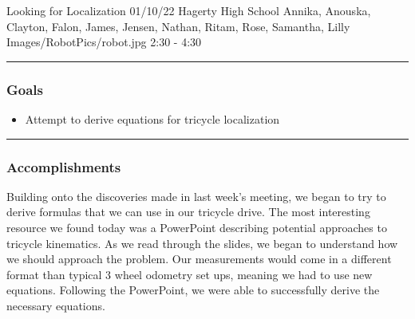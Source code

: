 \insertmeeting 
	{Looking for Localization} 
	{01/10/22} 
	{Hagerty High School}
	{Annika, Anouska, Clayton, Falon, James, Jensen, Nathan, Ritam, Rose, Samantha, Lilly}
	{Images/RobotPics/robot.jpg}
	{2:30 - 4:30}
	
\noindent\hfil\rule{\textwidth}{.4pt}\hfil
\subsubsection*{Goals}
\begin{itemize}
    \item Attempt to derive equations for tricycle localization

\end{itemize} 

\noindent\hfil\rule{\textwidth}{.4pt}\hfil

\subsubsection*{Accomplishments}
Building onto the discoveries made in last week's meeting, we began to try to derive formulas that we can use in our tricycle drive. The most interesting resource we found today was a PowerPoint describing potential approaches to tricycle kinematics. As we read through the slides, we began to understand how we should approach the problem. Our measurements would come in a different format than typical 3 wheel odometry set ups, meaning we had to use new equations. Following the PowerPoint, we were able to successfully derive the necessary equations. 
 


